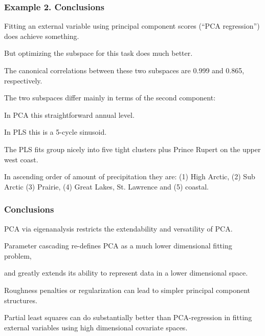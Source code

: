 \documentclass[11pt]{beamer}
\begin{document}
\begin{frame}

\frametitle{Example 2.  Conclusions}

\bi
  \item Fitting an external variable using principal component scores (``PCA regression'') does achieve something.
  \item But optimizing the subspace for this task does much better.
  \item The canonical correlations between these two subspaces are 0.999 and 0.865, respectively.
  \item The two subspaces differ mainly in terms of the second component:
  \bi
    \item In PCA this straightforward annual level.
    \item In PLS this is a 5-cycle sinusoid.
  \ei
  \item The PLS fits group nicely into five tight clusters plus Prince Rupert on the upper west coast.
  \item In ascending order of amount of precipitation they are:
  (1) High Arctic, (2) Sub Arctic (3) Prairie, (4) Great Lakes, St. Lawrence and (5) coastal.
\ei

\end{frame}


\begin{frame}

\frametitle{Conclusions}

\bi
  \item PCA via eigenanalysis restricts the extendability and versatility of PCA.
  \item Parameter cascading re-defines PCA as a much lower dimensional fitting problem,
  \item and greatly extends its ability to represent data in a lower dimensional space.
  \item Roughness penalties or regularization can lead to simpler principal component structures.
  \item Partial least squares can do substantially better than PCA-regression in fitting external variables using high dimensional covariate spaces.
\ei

\end{frame}
\end{document}
